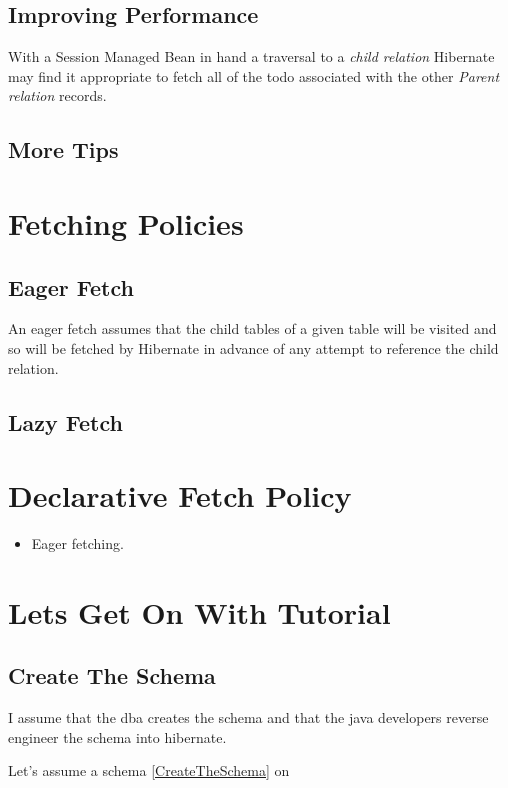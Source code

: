 \subsection{Improving Performance}
With a Session Managed Bean in hand 
a traversal to a \textit{child relation} Hibernate may find it appropriate 
to fetch all of the todo associated with the other \textit{Parent relation} records.




\subsection{More Tips}



\section{Fetching Policies}
\subsection{Eager Fetch}
An eager fetch assumes that the child tables of a given table will be visited and so will be fetched by Hibernate in advance of
any attempt to reference the child relation.


\subsection{Lazy Fetch}


\section{Declarative Fetch Policy}

\begin{itemize}
 \item Eager fetching.
\end{itemize}

\section{Lets Get On With Tutorial}
\subsection{Create The Schema}
I assume that the dba creates the schema and that the java developers reverse engineer the schema into hibernate.

Let's assume a schema \ref{CreateTheSchema} on \pageref{CreateTheSchema}

